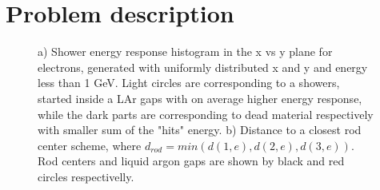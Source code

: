 \begin{figure}[!tbp]
\end{figure}




\section{Problem description}\label{sec:FSproblem}






\begin{figure}[!tbp]
\begin{minipage}[h]{0.49\linewidth}
\end{minipage}
\hfill
\begin{minipage}[h]{0.49\linewidth}
\end{minipage}
\caption{ a) Shower energy response histogram in the x vs y plane for electrons, generated with uniformly distributed x and y and energy less than 1 GeV. Light circles are corresponding to a showers, started inside a LAr gaps with on average higher energy response, while the dark parts are corresponding to dead material respectively with smaller sum of the "hits" energy.
b) Distance to a closest rod center scheme, where $d_{rod} = min( d(1,e), d(2, e), d(3, e))$. Rod centers and liquid argon gaps are shown by black and red circles respectivelly.}
\label{fig:FSFluctuations}
\end{figure}


